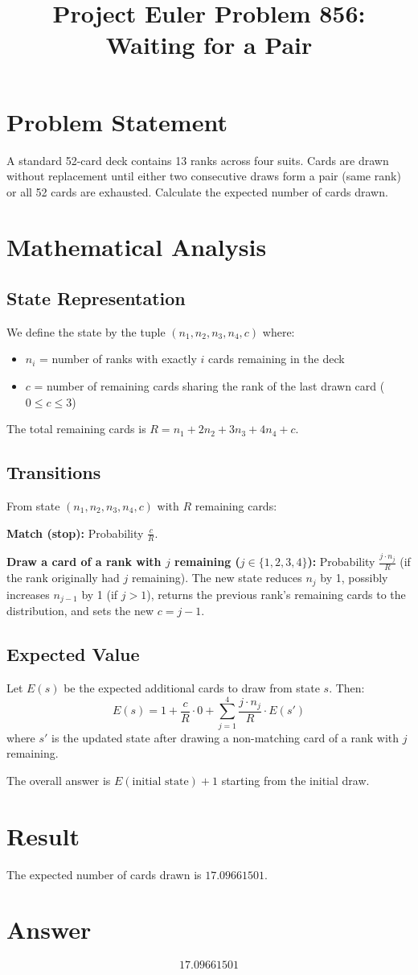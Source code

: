 \documentclass[12pt]{article}
\title{Project Euler Problem 856: Waiting for a Pair}
\author{}
\date{}
\begin{document}
\maketitle

\section{Problem Statement}
A standard 52-card deck contains 13 ranks across four suits. Cards are drawn without replacement until either two consecutive draws form a pair (same rank) or all 52 cards are exhausted. Calculate the expected number of cards drawn.

\section{Mathematical Analysis}

\subsection{State Representation}
We define the state by the tuple $(n_1, n_2, n_3, n_4, c)$ where:
\begin{itemize}
    \item $n_i$ = number of ranks with exactly $i$ cards remaining in the deck
    \item $c$ = number of remaining cards sharing the rank of the last drawn card ($0 \leq c \leq 3$)
\end{itemize}

The total remaining cards is $R = n_1 + 2n_2 + 3n_3 + 4n_4 + c$.

\subsection{Transitions}
From state $(n_1, n_2, n_3, n_4, c)$ with $R$ remaining cards:

\textbf{Match (stop):} Probability $\frac{c}{R}$.

\textbf{Draw a card of a rank with $j$ remaining ($j \in \{1,2,3,4\}$):}
Probability $\frac{j \cdot n_j}{R}$ (if the rank originally had $j$ remaining). The new state reduces $n_j$ by 1, possibly increases $n_{j-1}$ by 1 (if $j > 1$), returns the previous rank's remaining cards to the distribution, and sets the new $c = j-1$.

\subsection{Expected Value}
Let $E(s)$ be the expected additional cards to draw from state $s$. Then:
\[
E(s) = 1 + \frac{c}{R} \cdot 0 + \sum_{j=1}^{4} \frac{j \cdot n_j}{R} \cdot E(s')
\]
where $s'$ is the updated state after drawing a non-matching card of a rank with $j$ remaining.

The overall answer is $E(\text{initial state}) + 1$ starting from the initial draw.

\section{Result}
The expected number of cards drawn is $\boxed{17.09661501}$.

\section{Answer}

\[
\boxed{17.09661501}
\]
\end{document}
